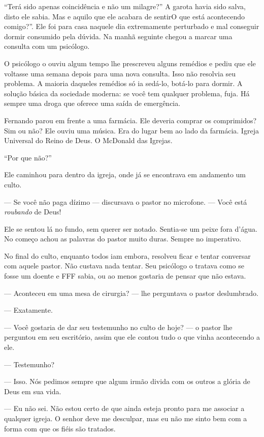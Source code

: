 ``Terá sido apenas coincidência e não um milagre?'' A garota havia sido salva, disto ele sabia. Mas e aquilo que ele acabara de sentirO que está acontecendo comigo?''. Ele foi para casa naquele dia extremamente perturbado e mal conseguir dormir\mudanca{,} consumido pela dúvida. Na manhã seguinte chegou a marcar uma consulta com um psicólogo.

O psicólogo o ouviu algum tempo lhe prescreveu alguns remédios e pediu que ele voltasse uma semana depois para uma nova consulta. Isso não resolvia seu problema. A maioria daqueles remédios só ia sedá-lo, botá-lo para dormir. A solução básica da sociedade moderna: se você tem qualquer problema, fuja. Há sempre uma droga que oferece uma saída de emergência.

Fernando parou em frente a uma farmácia. Ele deveria comprar os comprimidos? Sim ou não? Ele ouviu uma música. Era do lugar bem ao lado da farmácia. Igreja Universal do Reino de Deus. O McDonald das Igrejas.

``Por que não?''

Ele caminhou para dentro da igreja, onde já se encontrava em andamento um culto.

--- Se você não paga dízimo --- discursava o pastor no microfone. --- Você está \emph{roubando} de Deus!

Ele se sentou lá no fundo, sem querer ser notado. Sentia-se um peixe fora d'água. No começo achou as palavras do pastor muito duras. Sempre no imperativo.

No final do culto, enquanto todos iam embora, resolveu ficar e tentar conversar com aquele pastor. Não custava nada tentar. Seu psicólogo o tratava como se fosse um doente e FFF sabia, ou ao menos gostaria de pensar\mudanca{,} que não estava.

--- Aconteceu em uma mesa de cirurgia? --- lhe perguntava o pastor deslumbrado.

--- Exatamente.

--- Você gostaria de dar seu testemunho no culto de hoje? --- o pastor lhe perguntou em seu escritório, assim que ele contou tudo o que vinha acontecendo a ele.

--- Testemunho?

--- Isso. Nós pedimos sempre que algum irmão divida com os outros a glória de Deus em sua vida.

--- Eu não sei. Não estou certo de que ainda esteja pronto para me associar a qualquer igreja. O senhor deve me desculpar, mas eu não me sinto bem com a forma com que os fiéis são tratados.


